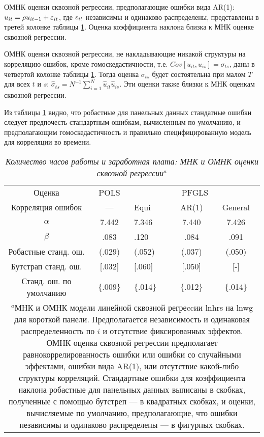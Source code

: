 ОМНК оценки сквозной регрессии, предполагающие ошибки вида AR(1): $u_{it}=\rho u_{it-1}+\varepsilon_{it}$, где $\varepsilon_{it}$ независимы и одинаково распределены, представлены в третей колонке таблицы \ref{Tab:21.7}. Оценка коэффициента наклона близка к МНК оценке сквозной регрессии.

ОМНК оценки сквозной регрессии, не накладывающие никакой структуры на корреляцию ошибок, кроме гомоскедастичности, т.е. $Cov[u_{it}, u_{is}]=\sigma_{ts}$, даны в четвертой колонке таблицы \ref{Tab:21.7}. Тогда оценка $\sigma_{ts}$ будет состоятельна при малом $T$ для всех $t$ и $s$: $\hat{\sigma}_{ts}=N^{-1}\sum^N_{i=1}\hat{u}_{it}\hat{u}_{is}$. Эти оценки также близки к МНК оценкам сквозной регрессии.

Из таблицы \ref{Tab:21.7} видно, что робастные для панельных данных стандатные ошибки следует предпочесть стандартным ошибкам, вычисленным по умолчанию, и предполагающим гомоскедастичность и правильно специфицированную модель для корреляции во времени.


 \begin{table}[ht]
\caption{{\it Количество часов работы и заработная плата: МНК и ОМНК оценки сквозной регрессии$^a$}} 
\centering
\begin{tabular}{cc p{2cm} cc}
\hline \hline
	Оценка & POLS & \multicolumn{3}{c}{PFGLS}\\
 Корреляция ошибок & --- & Equi & AR(1) & General\\
\hline
$\alpha$ & 7.442 & 7.346 & 7.440 & 7.426\\
$\beta$	& .083	& .120 	&.084 & .091 \\
Робастные станд. ош.		& (.029) &(.052) & (.037) & (.050) \\
Бутстрап станд. ош.			& [.032] & [.060] & [.050] &[-] \\
Станд. ош. по умолчанию	& \{.009\} & \{.014\}& \{.012\}  & \{.014\} \\
\hline \hline
\multicolumn{5}{p{14cm}}{$^a$МНК и ОМНК модели линейной сквозной регреccии lnhrs на lnwg для короткой панели. Предполагается независимость и одинаковая распределенность по $i$ и отсутствие фиксированных эффектов.  ОМНК оценка сквозной регрессии предполагает равнокоррелированность  ошибки или ошибки со случайными эффектами, ошибки вида AR(1), или отсутствие какой-либо структуры корреляций. Стандартные ошибки для коэффициента наклона робастные для панельных данных выписаны в скобках, полученные с помощью бутстреп --- в квадратных скобках, и оценки, вычисляемые по умолчанию, предполагающие, что ошибки независимы и одинаково распределены --- в фигурных скобках.} \\
\end{tabular}
\label{Tab:21.7}
\end{table}


